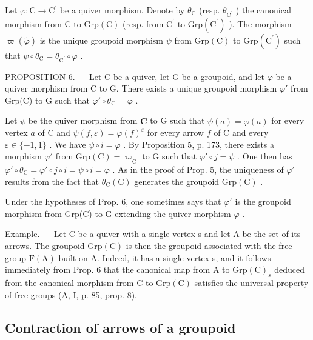 Let \(\varphi\colon\mathrm{C}\to\mathrm{C}^{\prime}\) be a quiver morphism. Denote by \(\theta_{\mathrm{C}}\) (resp. \(\theta_{\mathrm{C}^{\prime}}\) ) the canonical morphism from C to \(\mathrm{Grp}(\mathrm{C})\) (resp. from \(\mathrm{C}^{\prime}\) to \(\mathrm{Grp}(\mathrm{C}^{\prime})\) ). The morphism \(\varpi(\widetilde{\varphi})\) is the unique groupoid morphism \(\psi\) from \(\mathrm{Grp}(\mathrm{C})\) to \(\mathrm{Grp}(\mathrm{C}^{\prime})\) such that \(\psi\circ\theta_{\mathrm{C}}=\theta_{\mathrm{C}^{\prime}}\circ\varphi\) .

PROPOSITION 6. --- Let C be a quiver, let G be a groupoid, and let \(\varphi\) be a quiver morphism from C to G. There exists a unique groupoid morphism \(\varphi'\) from Grp(C) to G such that \(\varphi' \circ \theta_{\mathrm{C}} = \varphi\) .

Let \(\psi\) be the quiver morphism from \(\widetilde{\mathbf{C}}\) to G such that \(\psi(a) = \varphi(a)\) for every vertex \(a\) of C and \(\psi(f, \varepsilon) = \varphi(f)^{\varepsilon}\) for every arrow \(f\) of C and every \(\varepsilon \in \{-1, 1\}\) . We have \(\psi \circ i = \varphi\) . By Proposition 5, p. 173, there exists a morphism \(\varphi'\) from \(\mathrm{Grp}(\mathrm{C}) = \varpi_{\widetilde{\mathrm{C}}}\) to G such that \(\varphi' \circ j = \psi\) . One then has \(\varphi' \circ \theta_{\mathrm{C}} = \varphi' \circ j \circ i = \psi \circ i = \varphi\) . As in the proof of Prop. 5, the uniqueness of \(\varphi'\) results from the fact that \(\theta_{\mathrm{C}}(\mathrm{C})\) generates the groupoid \(\mathrm{Grp}(\mathrm{C})\) .

Under the hypotheses of Prop. 6, one sometimes says that \(\varphi'\) is the groupoid morphism from Grp(C) to G extending the quiver morphism \(\varphi\) .

Example. --- Let C be a quiver with a single vertex s and let A be the set of its arrows. The groupoid \(\mathrm{Grp}(\mathrm{C})\) is then the groupoid associated with the free group \(\mathrm{F}(\mathrm{A})\) built on A. Indeed, it has a single vertex s, and it follows immediately from Prop. 6 that the canonical map from A to \(\mathrm{Grp}(\mathrm{C})_{s}\) deduced from the canonical morphism from C to \(\mathrm{Grp}(\mathrm{C})\) satisfies the universal property of free groups (A, I, p. 85, prop. 8).

\subsection{Contraction of arrows of a groupoid}

